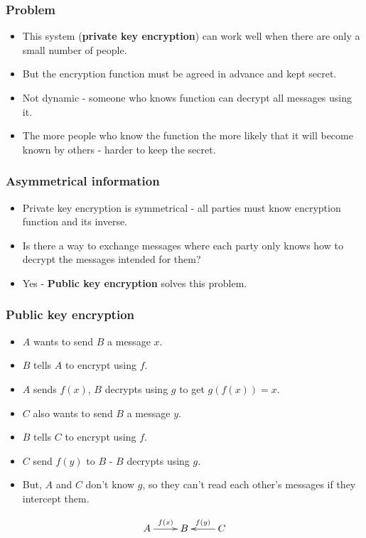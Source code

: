 \documentclass[handout]{beamer}
\begin{document}
\begin{frame}
\frametitle{Problem}
\begin{itemize}
\item This system (\textbf{private key encryption}) can work well when there are only a small number of people.
\vspace{1cm}
\item But the encryption function must be agreed in advance and kept secret.
\vspace{1cm}
\item Not dynamic - someone who knows function can decrypt all messages using it.
\vspace{1cm}
\item The more people who know the function the more likely that it will become known by others - harder to keep the secret.
\end{itemize}
\end{frame}

\begin{frame}
\frametitle{Asymmetrical information}
\begin{itemize}
\item Private key encryption is symmetrical - all parties must know encryption function and its inverse.
\vspace{1cm}
\item Is there a way to exchange messages where each party only knows how to decrypt the messages intended for them?
\vspace{1cm}
\item Yes - \textbf{Public key encryption} solves this problem.
\end{itemize}
\end{frame}

\begin{frame}
\frametitle{Public key encryption}
\begin{itemize}
\item $A$ wants to send $B$ a message $x$.
\item $B$ tells $A$ to encrypt using $f$.
\item $A$ sends $f(x)$, $B$ decrypts using $g$ to get $g(f(x)) = x$.
\item $C$ also wants to send $B$ a message $y$.
\item $B$ tells $C$ to encrypt using $f$.
\item $C$ send $f(y)$ to $B$ - $B$ decrypts using $g$.
\item But, $A$ and $C$ don't know $g$, so they can't read each other's messages if they intercept them.
\end{itemize} 

\[\xymatrix{A\ar[r]^{f(x)} & B & C\ar[l]_{f(y)}}\]
\end{frame}
\end{document}
